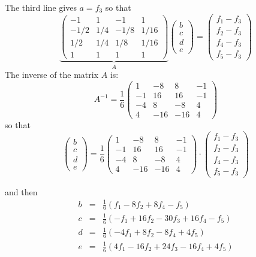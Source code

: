 The third line gives $a=f_3$ so that
\begin{equation}
\underbrace{
\left(
\begin{array}{ccccc}
-1  &  1   &  -1 &  1 \\ 
-1/2 &  1/4 & -1/8 &  1/16 \\ 
 1/2 &  1/4 &  1/8 &  1/16 \\ 
 1  &  1   &  1 &  1 
\end{array}
\right)}_{A}
\left(
\begin{array}{c}
b \\ c  \\ d \\ e
\end{array}
\right)
=
\left(
\begin{array}{c}
f_1 -f_3 \\ f_2 -f_3\\ f_4-f_3 \\ f_5 -f_3
\end{array}
\right)
\end{equation}
The inverse of the matrix $A$ is:
\[
A^{-1}=
\frac{1}{6}
\left(
\begin{array}{ccccc}
1 & -8 & 8 & -1 \\
-1 & 16 & 16 & -1 \\
-4 & 8 & -8 & 4 \\
4 & -16 & -16 & 4
\end{array}
\right)
\]
so that 
\[
\left(
\begin{array}{c}
b \\ c \\ d \\ e
\end{array}
\right)
=
\frac{1}{6}
\left(
\begin{array}{ccccc}
1 & -8 & 8 & -1 \\
-1 & 16 & 16 & -1 \\
-4 & 8 & -8 & 4 \\
4 & -16 & -16 & 4
\end{array}
\right)
\cdot
\left(
\begin{array}{c}
f_1 -f_3 \\ f_2 -f_3\\ f_4-f_3 \\ f_5 -f_3
\end{array}
\right)
\]

and then 
\begin{eqnarray}
b &=& \frac{1}{6} \left( f_1 -8f_2 +8 f_4 -f_5     \right) \\
c &=& \frac{1}{6} \left( -f_1 +16f_2 -30f_3    + 16f_4- f_5   \right) \\
d &=& \frac{1}{6} \left( -4f_1 +8f_2     -8f_4+ 4 f_5   \right) \\
e &=& \frac{1}{6} \left( 4f_1 -16f_2 +24f_3 -16f_4+ 4 f_5   \right) 
\end{eqnarray}

